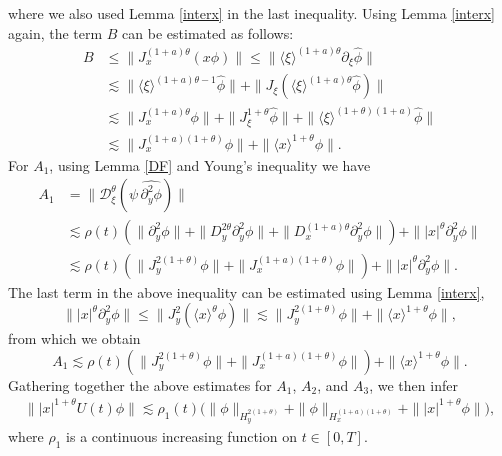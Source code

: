 \documentclass[reqno]{amsart}
\newcommand{\ha}{\hat{\phi}}
\newcommand{\lan}{\langle \xi \rangle}
\newcommand{\lanx}{\langle x \rangle}
\newcommand{\p}{\partial}
\numberwithin{equation}{section}
\begin{document}
where we also used Lemma \ref{interx} in the last inequality.
Using Lemma \ref{interx} again, the term $B$ can be estimated as follows:
\begin{equation*}
\begin{split}
B &\leq \|J_x^{(1+a)\theta}(x\phi)\|
\leq \|\lan^{(1+a)\theta}\p_\xi \ha\|\\
&\lesssim \|\lan^{(1+a)\theta-1}\ha\|+\|J_\xi(\lan^{(1+a)\theta}\ha)\|\\
&\lesssim \|J_x^{(1+a)\theta}\phi\|+\|J_\xi^{1+\theta}\ha\|+\|\lan^{(1+\theta)(1+a)}\ha\|\\
&\lesssim \|J_x^{(1+a)(1+\theta)}\phi\|+\|\lanx^{1+\theta}\phi\|.
\end{split}
\end{equation*} 
For $A_1$, using Lemma \ref{DF} and Young's inequality we have
\[
\begin{split}
A_1&=\|\mathcal{D}_\xi^\theta(\psi\, \widehat{\partial_y^2\phi})\|\\
&\lesssim \rho(t)\left(\|\partial_y^2\phi\|+\|D_y^{2\theta}\partial_y^2\phi\|+\|D_x^{(1+a)\theta}\partial_y^2\phi\|\right)+\||x|^\theta\partial_y^2\phi\| \\
& \lesssim \rho(t)\left(\|J_y^{2(1+\theta)}\phi\|+\|J_x^{(1+a)(1+\theta)}\phi\|\right)+\||x|^\theta\partial_y^2\phi\|.
\end{split}\]
The last term in the above inequality can be estimated using Lemma \ref{interx},
$$
\||x|^\theta\partial_y^2\phi\|\leq \|J^2_y(\langle x\rangle^\theta\phi)\|\lesssim \|J_y^{2(1+\theta)}\phi\|+\|\langle x \rangle^{1+\theta}\phi\|,
$$
from which we obtain
$$
A_1\lesssim \rho(t)\left(\|J_y^{2(1+\theta)}\phi\|+\|J_x^{(1+a)(1+\theta)}\phi\|\right)+\|\langle x \rangle^{1+\theta}\phi\|.
$$
Gathering together the above estimates for $A_1$, $A_2$, and $A_3$, we then infer
\begin{equation}\label{r1esti1}
\begin{split}
\||x|^{1+\theta}U(t)\phi\|\lesssim\rho_1(t)\big(\|\phi\|_{H^{2(1+\theta)}_y}+\|\phi\|_{H^{(1+a)(1+\theta)}_x}+\||x|^{1+\theta}\phi\|\big),
\end{split}
\end{equation}
where $\rho_1$ is a continuous increasing function on $t\in [0,T]$.
\end{document}
